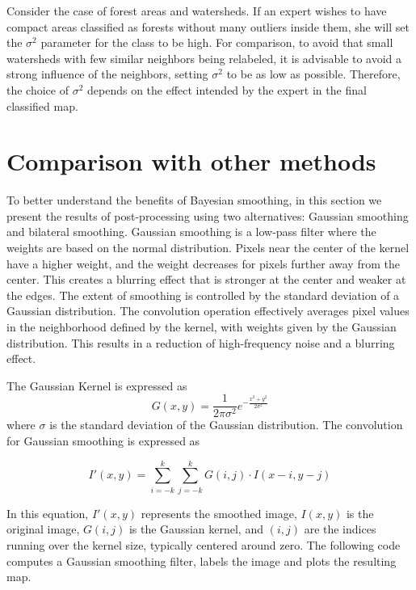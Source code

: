 \documentclass[
  shortnames]{jss}
\begin{document}
Consider the case of forest areas and watersheds. If an expert wishes to have compact areas classified as forests without many outliers inside them, she will set the \(\sigma^2\) parameter for the class  to be high. For comparison, to avoid that small watersheds with few similar neighbors being relabeled, it is advisable to avoid a strong influence of the neighbors, setting \(\sigma^2\) to be as low as possible. Therefore, the choice of \(\sigma^2\) depends on the effect intended by the expert in the final classified map.

\hypertarget{comparison-with-other-methods}{%
\section{Comparison with other methods}\label{comparison-with-other-methods}}

To better understand the benefits of Bayesian smoothing, in this section we present the results of post-processing using two alternatives: Gaussian smoothing and bilateral smoothing. Gaussian smoothing is a low-pass filter where the weights are based on the normal distribution. Pixels near the center of the kernel have a higher weight, and the weight decreases for pixels further away from the center. This creates a blurring effect that is stronger at the center and weaker at the edges. The extent of smoothing is controlled by the standard deviation of a Gaussian distribution. The convolution operation effectively averages pixel values in the neighborhood defined by the kernel, with weights given by the Gaussian distribution. This results in a reduction of high-frequency noise and a blurring effect.

The Gaussian Kernel is expressed as
\begin{equation}
   G(x, y) = \frac{1}{2\pi\sigma^2} e^{-\frac{x^2 + y^2}{2\sigma^2}}
\end{equation}
where \(\sigma\) is the standard deviation of the Gaussian distribution. The convolution for Gaussian smoothing is expressed as

\begin{equation}
   I'(x, y) = \sum_{i=-k}^{k} \sum_{j=-k}^{k} G(i, j) \cdot I(x - i, y - j)
\end{equation}

In this equation, \(I'(x, y)\) represents the smoothed image, \(I(x, y)\) is the original image, \(G(i, j)\) is the Gaussian kernel, and \((i,j)\) are the indices running over the kernel size, typically centered around zero. The following code computes a Gaussian smoothing filter, labels the image and plots the resulting map.
\end{document}
